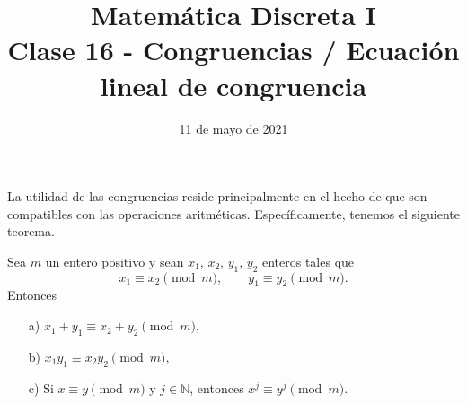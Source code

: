 \documentclass[handout]{beamer} %
\title[Clase 16 - Congruencia ]{Matemática Discreta I \\ Clase 16 - Congruencias / Ecuación lineal de congruencia}
\institute[]{\normalsize FAMAF / UNC
    \\[\baselineskip] ${}^{}$
    \\[\baselineskip]
}
\date[11/05/2021]{11 de mayo de 2021}
\begin{document}
    
    \frame{\titlepage} 
    
    
    \begin{frame}
        La utilidad de las congruencias reside principalmente en el hecho
        de que son compatibles con las operaciones aritméticas.
        Específicamente, tenemos el siguiente teorema.
        
        \begin{teorema}\label{t4.1} Sea $m$ un entero positivo y sean $x_1$, $x_2$,
            $y_1$, $y_2$ enteros tales que
            $$
            x_1 \equiv x_2 \pmod{m}, \qquad y_1 \equiv y_2 \pmod{m}.
            $$
            Entonces
            \begin{enumerate}
                \item[a)] $ x_1+ y_1 \equiv x_2+ y_2 \pmod{m}$,
                \item[b)] $x_1 y_1 \equiv x_2 y_2 \pmod{m}$,
                \item[c)] Si $x \equiv y \pmod{m}$  y $j \in  \mathbb N$, entonces $x^j \equiv y^j \pmod{m}$.
            \end{enumerate}
        \end{teorema}
        
    \end{frame}
    
    
    
\end{document}
